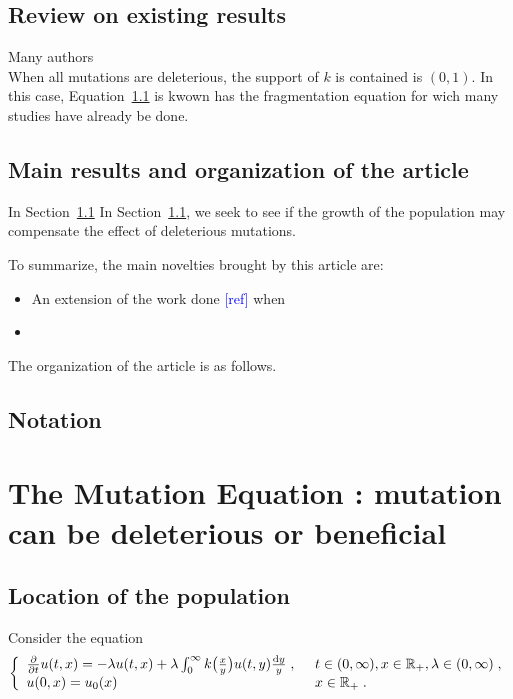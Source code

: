 \documentclass[11pt]{amsart}
\newcommand{\MD}{\color{vert}}
\newcommand{\ndr}[1]{\textcolor{blue}{[#1]}}
\begin{document}
\subsection{Review on existing results}

\MD{}

Many authors \\



When all mutations are deleterious, the support of $k$ is contained is $(0,1)$. In this case, Equation~\ref{} is kwown has the fragmentation equation for wich many studies have already be done. 

\subsection{Main results and organization of the article}

In Section~\ref{}
In Section~\ref{}, we seek to see if the growth of the population may compensate the effect of deleterious mutations. 

To summarize, the main novelties brought by this article are: 
\begin{itemize}
    \item An extension of the work done \ndr{ref} when
    \item 
\end{itemize}

The organization of the article is as follows.

\subsection{Notation}




\section{The Mutation Equation : mutation can be deleterious or beneficial}



\subsection{Location of the population}

Consider the equation
\begin{equation}\left\{
    \begin{array}{ll}
	\frac{\partial}{\partial t}u(t,x) = - \lambda u(t,x) + \lambda \int_{0}^{\infty} k\big( \frac{x}{y}\big)u(t,y) \frac{\mathrm dy}{y}
	\; , \enspace
	& t \in (0, \infty), x \in \mathbb{R}_+, \lambda \in (0, \infty) \; ,
	\\
	u(0, x) = u_0(x)
	& x \in \mathbb{R}_+
	\; .
    \end{array}
	\right.
    \label{eq:main}
\end{equation}
\end{document}
